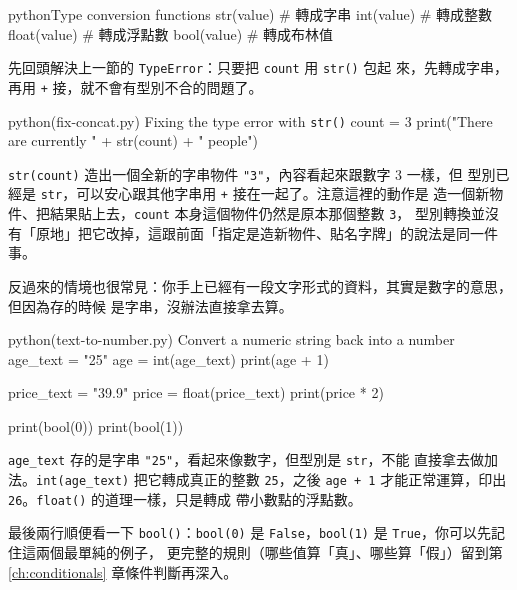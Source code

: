 \begin{code}{python}{Type conversion functions}
str(value)      # 轉成字串
int(value)      # 轉成整數
float(value)    # 轉成浮點數
bool(value)     # 轉成布林值
\end{code}

先回頭解決上一節的 \texttt{TypeError}：只要把 \texttt{count} 用 \texttt{str()} 包起
來，先轉成字串，再用 \texttt{+} 接，就不會有型別不合的問題了。

\begin{example}{python}{(fix-concat.py) Fixing the type error with \texttt{str()}}
count = 3
print("There are currently " + str(count) + " people")
\end{example}


\texttt{str(count)} 造出一個全新的字串物件 \texttt{"3"}，內容看起來跟數字 3 一樣，但
型別已經是 \texttt{str}，可以安心跟其他字串用 \texttt{+} 接在一起了。注意這裡的動作是
造一個新物件、把結果貼上去，\texttt{count} 本身這個物件仍然是原本那個整數 \texttt{3}，
型別轉換並沒有「原地」把它改掉，這跟前面「指定是造新物件、貼名字牌」的說法是同一件事。

反過來的情境也很常見：你手上已經有一段文字形式的資料，其實是數字的意思，但因為存的時候
是字串，沒辦法直接拿去算。

\begin{example}{python}{(text-to-number.py) Convert a numeric string back into a number}
age_text = "25"
age = int(age_text)
print(age + 1)

price_text = "39.9"
price = float(price_text)
print(price * 2)

print(bool(0))
print(bool(1))
\end{example}


\texttt{age\_text} 存的是字串 \texttt{"25"}，看起來像數字，但型別是 \texttt{str}，不能
直接拿去做加法。\texttt{int(age\_text)} 把它轉成真正的整數 \texttt{25}，之後
\texttt{age + 1} 才能正常運算，印出 \texttt{26}。\texttt{float()} 的道理一樣，只是轉成
帶小數點的浮點數。

最後兩行順便看一下 \texttt{bool()}：\texttt{bool(0)} 是
\texttt{False}，\texttt{bool(1)} 是 \texttt{True}，你可以先記住這兩個最單純的例子，
更完整的規則（哪些值算「真」、哪些算「假」）留到第 \ref{ch:conditionals} 章條件判斷再深入。

